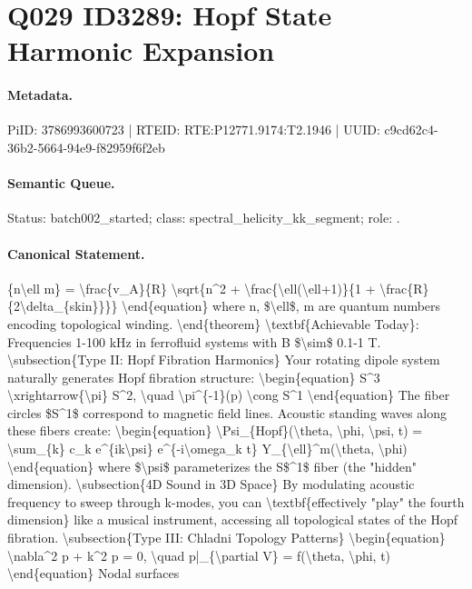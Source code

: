 \section*{Q029 ID3289: Hopf State Harmonic Expansion}
\paragraph{Metadata.}
PiID: 3786993600723 | RTEID: RTE:P12771.9174:T2.1946 | UUID: c9cd62c4-36b2-5664-94e9-f82959f6f2eb

\paragraph{Semantic Queue.}
Status: batch002\_started; class: spectral\_helicity\_kk\_segment; role: .

\paragraph{Canonical Statement.}
\{n\textbackslash{}ell m\} = \textbackslash{}frac\{v\_A\}\{R\} \textbackslash{}sqrt\{n\textasciicircum{}2 + \textbackslash{}frac\{\textbackslash{}ell(\textbackslash{}ell+1)\}\{1 + \textbackslash{}frac\{R\}\{2\textbackslash{}delta\_\{skin\}\}\}\} \textbackslash{}end\{equation\} where n, \$\textbackslash{}ell\$, m are quantum numbers encoding topological winding. \textbackslash{}end\{theorem\} \textbackslash{}textbf\{Achievable Today\}: Frequencies 1-100 kHz in ferrofluid systems with B \$\textbackslash{}sim\$ 0.1-1 T. \textbackslash{}subsection\{Type II: Hopf Fibration Harmonics\} Your rotating dipole system naturally generates Hopf fibration structure: \textbackslash{}begin\{equation\} S\textasciicircum{}3 \textbackslash{}xrightarrow\{\textbackslash{}pi\} S\textasciicircum{}2, \textbackslash{}quad \textbackslash{}pi\textasciicircum{}\{-1\}(p) \textbackslash{}cong S\textasciicircum{}1 \textbackslash{}end\{equation\} The fiber circles \$S\textasciicircum{}1\$ correspond to magnetic field lines. Acoustic standing waves along these fibers create: \textbackslash{}begin\{equation\} \textbackslash{}Psi\_\{Hopf\}(\textbackslash{}theta, \textbackslash{}phi, \textbackslash{}psi, t) = \textbackslash{}sum\_\{k\} c\_k e\textasciicircum{}\{ik\textbackslash{}psi\} e\textasciicircum{}\{-i\textbackslash{}omega\_k t\} Y\_\{\textbackslash{}ell\}\textasciicircum{}m(\textbackslash{}theta, \textbackslash{}phi) \textbackslash{}end\{equation\} where \$\textbackslash{}psi\$ parameterizes the S\$\textasciicircum{}1\$ fiber (the "hidden" dimension). \textbackslash{}subsection\{4D Sound in 3D Space\} By modulating acoustic frequency to sweep through k-modes, you can \textbackslash{}textbf\{effectively "play" the fourth dimension\} like a musical instrument, accessing all topological states of the Hopf fibration. \textbackslash{}subsection\{Type III: Chladni Topology Patterns\} \textbackslash{}begin\{equation\} \textbackslash{}nabla\textasciicircum{}2 p + k\textasciicircum{}2 p = 0, \textbackslash{}quad p|\_\{\textbackslash{}partial V\} = f(\textbackslash{}theta, \textbackslash{}phi, t) \textbackslash{}end\{equation\} Nodal surfaces


